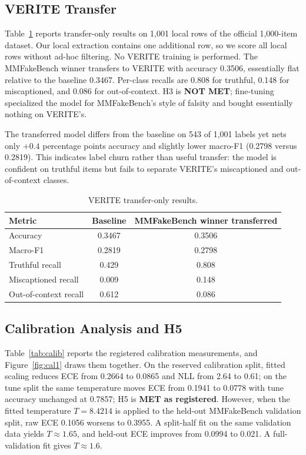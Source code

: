 \documentclass{article} %
\begin{document}
\subsection{VERITE Transfer}
Table~\ref{tab:verite} reports transfer-only results on 1,001 local rows of the official 1,000-item dataset. Our local extraction contains one additional row, so we score all local rows without ad-hoc filtering. No VERITE training is performed. The MMFakeBench winner transfers to VERITE with accuracy 0.3506, essentially flat relative to the baseline 0.3467. Per-class recalls are 0.808 for truthful, 0.148 for miscaptioned, and 0.086 for out-of-context. H3 is \textbf{NOT MET}; fine-tuning specialized the model for MMFakeBench's style of falsity and bought essentially nothing on VERITE's.

The transferred model differs from the baseline on 543 of 1,001 labels yet nets only \(+0.4\) percentage points accuracy and slightly lower macro-F1 (0.2798 versus 0.2819). This indicates label churn rather than useful transfer: the model is confident on truthful items but fails to separate VERITE's miscaptioned and out-of-context classes.

\begin{table}[t]
\centering
\small
\caption{VERITE transfer-only results.}
\label{tab:verite}
\begin{tabular}{lcc}
\toprule
Metric & Baseline & MMFakeBench winner transferred \\
\midrule
Accuracy & 0.3467 & 0.3506 \\
Macro-F1 & 0.2819 & 0.2798 \\
Truthful recall & 0.429 & 0.808 \\
Miscaptioned recall & 0.009 & 0.148 \\
Out-of-context recall & 0.612 & 0.086 \\
\bottomrule
\end{tabular}
\end{table}

\subsection{Calibration Analysis and H5}
Table~\ref{tab:calib} reports the registered calibration measurements, and Figure~\ref{fig:cal1} draws them together. On the reserved calibration split, fitted scaling reduces ECE from 0.2664 to 0.0865 and NLL from 2.64 to 0.61; on the tune split the same temperature moves ECE from 0.1941 to 0.0778 with tune accuracy unchanged at 0.7857; H5 is \textbf{MET as registered}. However, when the fitted temperature \(T=8.4214\) is applied to the held-out MMFakeBench validation split, raw ECE 0.1056 worsens to 0.3955. A split-half fit on the same validation data yields \(T\approx1.65\), and held-out ECE improves from 0.0994 to 0.021. A full-validation fit gives \(T\approx1.6\).
\end{document}
